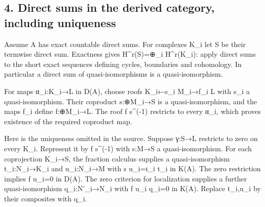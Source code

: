 \documentclass[11pt]{article}
\begin{document}
\subsection{\texorpdfstring{4. Direct sums in the derived category,\allowbreak{} including uniqueness}{4. Direct sums in the derived  including uniqueness}}\label{proofs-10139-10427-direct-sums-in-the-derived-category-including-uniqueness}

Assume A has exact countable direct sums. For complexes K\_\allowbreak{}i let S be their termwise direct sum. Exactness gives H\textasciicircum{}r(S)\allowbreak{}\allowbreak{}=\allowbreak{}⊕\_\allowbreak{}i H\textasciicircum{}r(K\_\allowbreak{}i)\allowbreak{}:\allowbreak{} apply direct sums to the short exact sequences defining cycles,\allowbreak{} boundaries and cohomology. In particular a direct sum of quasi-isomorphisms is a quasi-isomorphism.

For maps α\_\allowbreak{}i:\allowbreak{}K\_\allowbreak{}i\allowbreak{}→L in D(A)\allowbreak{},\allowbreak{} choose roofs K\_\allowbreak{}i←s\_\allowbreak{}i M\_\allowbreak{}i\allowbreak{}→f\_\allowbreak{}i L with s\_\allowbreak{}i a quasi-isomorphism. Their coproduct s:\allowbreak{}\allowbreak{}⊕M\_\allowbreak{}i\allowbreak{}→S is a quasi-isomorphism,\allowbreak{} and the maps f\_\allowbreak{}i define f:\allowbreak{}\allowbreak{}⊕M\_\allowbreak{}i\allowbreak{}→L. The roof f s\textasciicircum{}(-1)\allowbreak{} restricts to every α\_\allowbreak{}i,\allowbreak{} which proves existence of the required coproduct map.

Here is the uniqueness omitted in the source. Suppose γ:\allowbreak{}S\allowbreak{}→L restricts to zero on every K\_\allowbreak{}i. Represent it by f s\textasciicircum{}(-1)\allowbreak{} with s:\allowbreak{}M\allowbreak{}→S a quasi-isomorphism. For each coprojection K\_\allowbreak{}i\allowbreak{}→S,\allowbreak{} the fraction calculus supplies a quasi-isomorphism t\_\allowbreak{}i:\allowbreak{}N\_\allowbreak{}i\allowbreak{}→K\_\allowbreak{}i and u\_\allowbreak{}i:\allowbreak{}N\_\allowbreak{}i\allowbreak{}→M with s u\_\allowbreak{}i\allowbreak{}=ι\_\allowbreak{}i t\_\allowbreak{}i in K(A)\allowbreak{}. The zero restriction implies f u\_\allowbreak{}i\allowbreak{}=0 in D(A)\allowbreak{}. The zero criterion for localization supplies a further quasi-isomorphism q\_\allowbreak{}i:\allowbreak{}N'\_\allowbreak{}i\allowbreak{}→N\_\allowbreak{}i with f u\_\allowbreak{}i q\_\allowbreak{}i\allowbreak{}=0 in K(A)\allowbreak{}. Replace t\_\allowbreak{}i,\allowbreak{}u\_\allowbreak{}i by their composites with q\_\allowbreak{}i.
\end{document}
